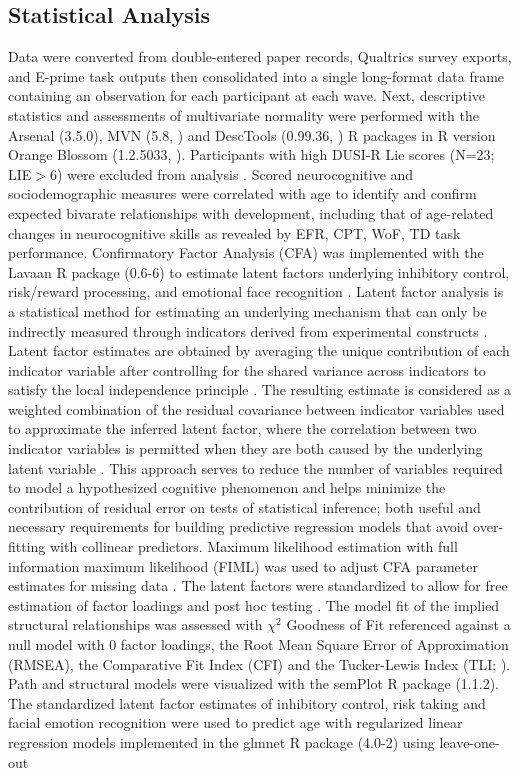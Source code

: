 \documentclass[utf8]{stylesheet}
\begin{document}
\subsection{Statistical Analysis} Data were converted from double-entered paper records, Qualtrics survey exports, and E-prime task outputs then consolidated into a single long-format data frame containing an observation for each participant at each wave. Next, descriptive statistics and assessments of multivariate normality were performed with the Arsenal (3.5.0), MVN (5.8, \cite{MVN}) and DescTools (0.99.36, \cite{DescTools}) R packages in R version Orange Blossom (1.2.5033, \cite{R}). Participants with high DUSI-R Lie scores (N=23; LIE$>6$) were excluded from analysis \citep{dalla2003effects}. Scored neurocognitive and sociodemographic measures were correlated with age to identify and confirm expected bivarate relationships with development, including that of age-related changes in neurocognitive skills as revealed by EFR, CPT, WoF, TD task performance. Confirmatory Factor Analysis (CFA) was implemented with the Lavaan R package (0.6-6) to estimate latent factors underlying inhibitory control, risk/reward processing, and emotional face recognition \citep{Lavaan}. Latent factor analysis is a statistical method for estimating an underlying mechanism that can only be indirectly measured through indicators derived from experimental constructs \citep{finch2015latent}. Latent factor estimates are obtained by averaging the unique contribution of each indicator variable after controlling for the shared variance across indicators to satisfy the local independence principle \citep{sobel1997measurement}. The resulting estimate is considered as a weighted combination of the residual covariance between indicator variables used to approximate the inferred latent factor, where the correlation between two indicator variables is permitted when they are both caused by the underlying latent variable \citep{cooper2019neuroimaging}. This approach serves to reduce the number of variables required to model a hypothesized cognitive phenomenon and helps minimize the contribution of residual error on tests of statistical inference; both useful and necessary requirements for building predictive regression models that avoid over-fitting with collinear predictors. Maximum likelihood estimation with full information maximum likelihood (FIML) was used to adjust CFA parameter estimates for missing data \citep{cham2017full}. The latent factors were standardized to allow for free estimation of factor loadings and post hoc testing \citep{HuTzeBentler1998}. The model fit of the implied structural relationships was assessed with $\chi^2$ Goodness of Fit referenced against a null model with $0$ factor loadings, the Root Mean Square Error of Approximation (RMSEA), the Comparative Fit Index (CFI) and the Tucker-Lewis Index (TLI; \cite{KennyEtAl2015,HuTzeBentler1999, wu2009evaluating}). Path and structural models were visualized with the semPlot R package (1.1.2). The standardized latent factor estimates of inhibitory control, risk taking and facial emotion recognition were used to predict age with regularized linear regression models implemented in the glmnet R package (4.0-2) using leave-one-out 
\end{document}
